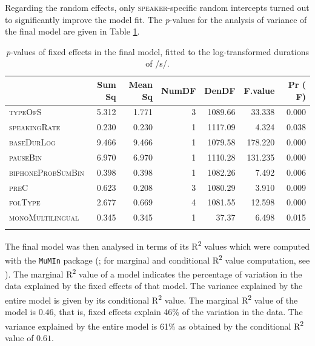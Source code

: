 Regarding the random effects, only \textsc{speaker}-specific random intercepts turned out to significantly improve the model fit. The \textit{p}-values for the analysis of variance of the final model are given in Table \ref{tab:4.4}.

\begin{table}\fontsize{10}{11}
\caption{\textit{p}-values of fixed effects in the final model, fitted to the log-transformed durations of /s/.}
\label{tab:4.4}
\centering
\begin{tabular}{lrrrrrr} 
\lsptoprule
~                 & Sum Sq & Mean Sq & NumDF & DenDF   & F.value & Pr ( F)  \\ 
\midrule
\textsc{typeOfS}           & 5.312  & 1.771   & 3     & 1089.66 & 33.338  & 0.000    \\
\textsc{speakingRate}      & 0.230  & 0.230   & 1     & 1117.09 & 4.324   & 0.038    \\
\textsc{baseDurLog}        & 9.466  & 9.466   & 1     & 1079.58 & 178.220 & 0.000    \\
\textsc{pauseBin}          & 6.970  & 6.970   & 1     & 1110.28 & 131.235 & 0.000    \\
\textsc{biphoneProbSumBin} & 0.398  & 0.398   & 1     & 1082.26 & 7.492   & 0.006    \\
\textsc{preC}              & 0.623  & 0.208   & 3     & 1080.29 & 3.910   & 0.009    \\
\textsc{folType}           & 2.677  & 0.669   & 4     & 1081.55 & 12.598  & 0.000    \\
\textsc{monoMultilingual}  & 0.345  & 0.345   & 1     & 37.37   & 6.498   & 0.015    \\
\lspbottomrule
\end{tabular}
\end{table}

The final model was then analysed in terms of its R\textsuperscript{2} values which were computed with the \texttt{MuMIn} package (\cite{Barton2020}; for marginal and conditional R\textsuperscript{2} value computation, see \cite{Nakagawa2017}). The marginal R\textsuperscript{2} value of a model indicates the percentage of variation in the data explained by the fixed effects of that model. The variance explained by the entire model is given by its conditional R\textsuperscript{2} value. The marginal R\textsuperscript{2} value of the model is $0.46$, that is, fixed effects explain 46\% of the variation in the data. The variance explained by the entire model is 61\% as obtained by the conditional R\textsuperscript{2} value of $0.61$.

